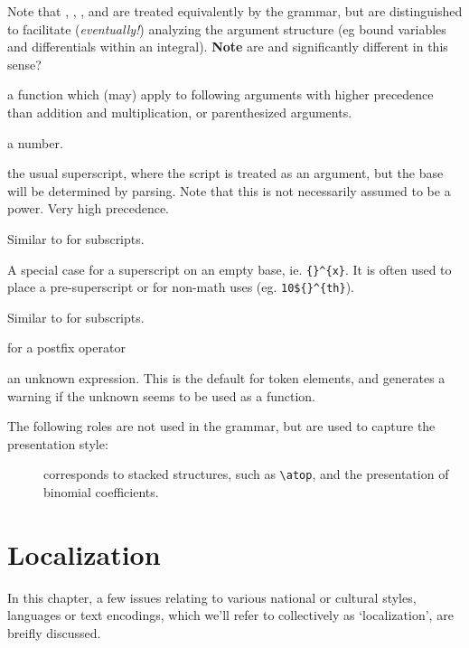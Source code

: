 \documentclass{book}
\begin{document}
\begin{description}
 Note that , , ,  and  are treated
 equivalently by the grammar, but are distinguished to facilitate (\emph{eventually!}) 
 analyzing the argument structure (eg bound variables and differentials within an integral).
 \textbf{Note} are  and  significantly different in this sense?
\item[\code{VERTBAR}]
\item[\code{FUNCTION}] a function which (may) apply to following arguments with higher
   precedence than addition and multiplication, or parenthesized arguments.
\item[\code{NUMBER}] a number.
\item[\code{POSTSUPERSCRIPT}] the usual superscript, where the script is treated as
  an argument, but the base will be determined by parsing. Note that this is not
  necessarily assumed to be a power. Very high precedence.
\item[\code{POSTSUBSCRIPT}] Similar to  for subscripts.
\item[\code{FLOATINGSUPERSCRIPT}] A special case for a superscript on an empty base,
  ie. \verb|{}^{x}|.  It is often used to place a pre-superscript or for
  non-math uses (eg. \verb|10${}^{th}|).
\item[\code{FLOATINGSUBSCRIPT}] Similar to  for subscripts.
\item[\code{POSTFIX}] for a postfix operator
\item[\code{UNKNOWN}] an unknown expression. This is the default for token elements,
  and generates a warning if the unknown seems to be used as a function.
\end{description}

The following roles are not used in the grammar, but are used to capture
the presentation style:
\begin{description}
\item[] corresponds to stacked structures, such as
  \verb|\atop|, and the presentation of binomial coefficients.
\end{description}

\chapter{Localization}\label{localization}
In this chapter, a few issues relating to various national or cultural styles,
languages or text encodings, which we'll refer to collectively as `localization', are breifly discussed.
\end{document}
